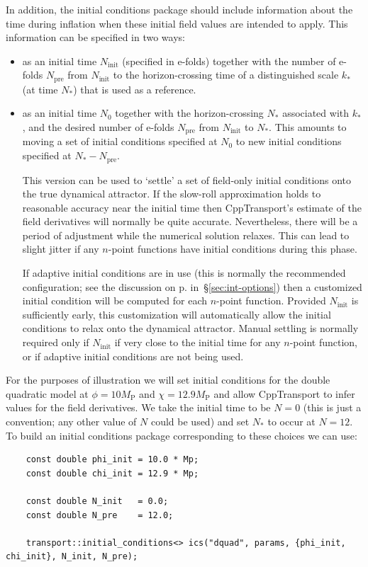 \documentclass[11pt,a4paper]{article}
\newcommand{\Mp}{M_{\mathrm{P}}}
\newcommand{\Ninit}{N_{\text{init}}}
\newcommand{\Nstar}{N_{\ast}}
\newcommand{\Npre}{N_{\text{pre}}}
\newcommand{\Nzero}{N_{0}}
\newcommand{\kstar}{k_{\ast}}
\newcommand{\packagefont}{\sffamily}
\newcommand{\CppTransport}{{\packagefont CppTransport}}
\begin{document}
In addition, the initial conditions package
should include
information about the time during inflation when these
initial field values are intended to apply.
This information can be specified in two ways:
\begin{itemize}
	\item as an initial time $\Ninit$ (specified in e-folds)
	together with the number of e-folds $\Npre$ from
	$\Ninit$ to the horizon-crossing time of a distinguished
	scale $\kstar$ (at time $\Nstar$) that is used as a reference.
	
	\item as an initial time $\Nzero$
	together with the horizon-crossing $\Nstar$
	associated with $\kstar$,
	and the desired number of e-folds $\Npre$
	from $\Ninit$ to $\Nstar$.
	This amounts to moving a set of initial conditions specified
	at $\Nzero$ to new initial conditions specified at
	$\Nstar - \Npre$.
	
	This version can be used to `settle' a set of field-only
	initial conditions onto the true dynamical attractor.
	If the slow-roll approximation holds to reasonable accuracy
	near the initial time then {\CppTransport}'s estimate
	of the field derivatives will normally be quite accurate.
	Nevertheless, there will be a period of adjustment while the
	numerical solution relaxes.
	This can lead to slight jitter if any $n$-point functions
	have initial conditions during this phase.
	
	If adaptive initial conditions are in use
	(this is normally the recommended configuration; see
	the discussion on p.\pageref{enum:adpative-ics}
	in~\S\ref{sec:int-options})
	then a customized initial condition will be computed for
	each $n$-point function.
	Provided $\Ninit$ is sufficiently early, this customization
	will automatically allow the initial conditions to relax onto
	the dynamical attractor.
	Manual settling is normally required only if
	$\Ninit$ if very close to the initial time for
	any $n$-point function, or if adaptive initial conditions
	are not being used.
\end{itemize}
For the purposes of illustration we will
set initial conditions for the double quadratic model
at $\phi = 10 \Mp$ and $\chi = 12.9 \Mp$
and allow {\CppTransport} to infer
values for the field derivatives.
We take the initial time to be $N=0$
(this is just a convention; any other value of $N$ could be used)
and set $\Nstar$ to occur at $N=12$.
To build an initial conditions package corresponding to these choices
we can use:
\begin{verbatim}
    const double phi_init = 10.0 * Mp;
    const double chi_init = 12.9 * Mp;

    const double N_init   = 0.0;
    const double N_pre    = 12.0;

    transport::initial_conditions<> ics("dquad", params, {phi_init, chi_init}, N_init, N_pre);
\end{verbatim}
\end{document}
